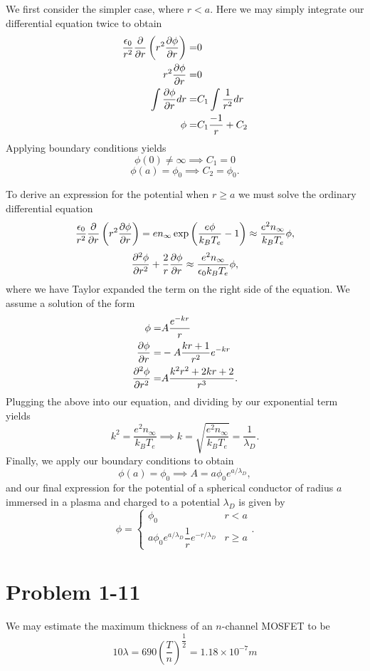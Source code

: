 We first consider the simpler case, where \(r < a\). Here we may simply integrate our differential equation twice to obtain
\begin{align*}
	\dfrac{\epsilon_0}{r^2} \dfrac{\partial}{\partial r} \left(r^2\frac{\partial \phi}{\partial r}\right) =& 0 \\
	r^2\frac{\partial \phi}{\partial r} =& 0 \\
	\int \frac{\partial \phi}{\partial r} dr =& C_1\int \dfrac{1}{r^2}dr \\ 
	\phi =& C_1 \dfrac{-1}{r} + C_2
\end{align*}
Applying boundary conditions yields
\begin{equation}
	\phi(0) \neq \infty \implies C_1 = 0
\end{equation}
\begin{equation}
	\phi(a) = \phi_0 \implies C_2 = \phi_0.
\end{equation}

To derive an expression for the potential when \(r \geq a\) we must solve the ordinary differential equation
\begin{equation}
	\dfrac{\epsilon_0}{r^2} \dfrac{\partial}{\partial r} \left(r^2\frac{\partial \phi}{\partial r}\right)  = 
	en_\infty\exp{\left(\dfrac{e\phi}{k_BT_e}-1\right)} \approx \dfrac{e^2n_\infty}{k_BT_e}\phi,
\end{equation}
\begin{equation}
\dfrac{\partial^2 \phi}{\partial r^2} +  \dfrac{2}{r}\frac{\partial \phi}{\partial r} \approx \dfrac{e^2n_\infty}{\epsilon_0k_BT_e}\phi,
\end{equation}
where we have Taylor expanded the term on the right side of the equation. We assume a solution of the form
\begin{align*}
	\phi =& A\dfrac{e^{-kr}}{r} \\
	\frac{\partial \phi}{\partial r} =& -A\dfrac{kr + 1}{r^2}e^{-kr} \\
	\dfrac{\partial^2\phi}{\partial r^2} =& A\dfrac{k^2r^2 + 2kr + 2}{r^3}.
\end{align*}
Plugging the above into our equation, and dividing by our exponential term yields
\begin{equation}
	k^2 = \dfrac{e^2n_\infty}{k_BT_e} \implies k = \sqrt{\dfrac{e^2n_\infty}{k_BT_e}} = \dfrac{1}{\lambda_D}.
\end{equation}
Finally, we apply our boundary conditions to obtain
\begin{equation}
	\phi(a) = \phi_0 \implies A = a\phi_0e^{a/\lambda_D},
\end{equation}
and our final expression for the potential of a spherical conductor of radius \(a\) immersed in a plasma and charged to a potential \(\lambda_D \) is given by
\begin{equation}
	\phi = \begin{cases}
	\phi_0 & r < a \\
	a\phi_0e^{a/\lambda_D}\dfrac{1}{r}e^{-r/\lambda_D} & r \geq a
	\end{cases}.
\end{equation}

\section*{Problem 1-11}
\label{sec:1-11}
We may estimate the maximum thickness of an \(n\)-channel MOSFET to be 
\begin{equation}
	10\lambda = 690(\dfrac{T}{n})^{\dfrac{1}{2}} = 1.18\times10^{-7}m
\end{equation}